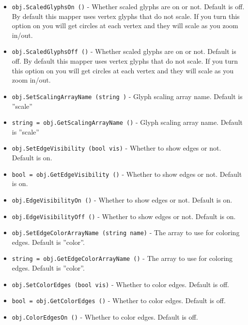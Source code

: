 \begin{itemize}
\item  \verb|obj.ScaledGlyphsOn ()| -  Whether scaled glyphs are on or not.  Default is off.
 By default this mapper uses vertex glyphs that do not
 scale. If you turn this option on you will get circles
 at each vertex and they will scale as you zoom in/out.

\item  \verb|obj.ScaledGlyphsOff ()| -  Whether scaled glyphs are on or not.  Default is off.
 By default this mapper uses vertex glyphs that do not
 scale. If you turn this option on you will get circles
 at each vertex and they will scale as you zoom in/out.

\item  \verb|obj.SetScalingArrayName (string )| -  Glyph scaling array name. Default is ''scale''

\item  \verb|string = obj.GetScalingArrayName ()| -  Glyph scaling array name. Default is ''scale''

\item  \verb|obj.SetEdgeVisibility (bool vis)| -  Whether to show edges or not.  Default is on.

\item  \verb|bool = obj.GetEdgeVisibility ()| -  Whether to show edges or not.  Default is on.

\item  \verb|obj.EdgeVisibilityOn ()| -  Whether to show edges or not.  Default is on.

\item  \verb|obj.EdgeVisibilityOff ()| -  Whether to show edges or not.  Default is on.

\item  \verb|obj.SetEdgeColorArrayName (string name)| -  The array to use for coloring edges.  Default is ''color''.

\item  \verb|string = obj.GetEdgeColorArrayName ()| -  The array to use for coloring edges.  Default is ''color''.

\item  \verb|obj.SetColorEdges (bool vis)| -  Whether to color edges.  Default is off.

\item  \verb|bool = obj.GetColorEdges ()| -  Whether to color edges.  Default is off.

\item  \verb|obj.ColorEdgesOn ()| -  Whether to color edges.  Default is off.


\end{itemize}

